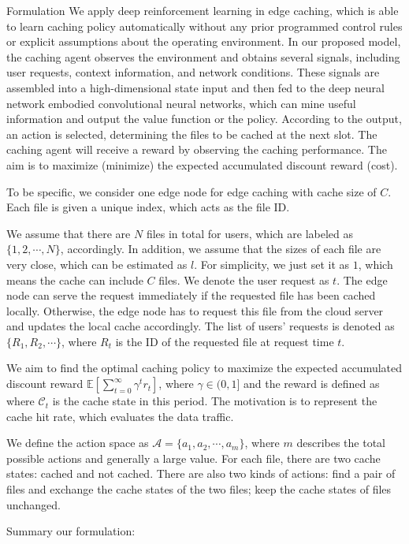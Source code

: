 \documentclass{article}
\begin{document}
\begin{section}{Formulation}
    We apply deep reinforcement learning in edge caching, which is able to learn caching policy automatically without any prior programmed control rules or explicit assumptions about the operating environment. In our proposed model, the caching agent observes the environment and obtains several signals, including user requests, context information, and network conditions. These signals are assembled into a high-dimensional state input and then fed to the deep neural network embodied convolutional neural networks, which can mine useful information and output the value function or the policy. According to the output, an action is selected, determining the files to be cached at the next slot. The caching agent will receive a reward by observing the caching performance. The aim is to maximize (minimize) the expected accumulated discount reward (cost).

    To be specific, we consider one edge node for edge caching with cache size of $C$. Each file is given a unique index, which acts as the file ID. 

    We assume that there are $N$ files in total for users, which are labeled as $\{1,2,\cdots,N\}$, accordingly. In addition, we assume that the sizes of each file are very close, which can be estimated as $l$. For simplicity, we just set it as $1$, which means the cache can include $C$ files. We denote the user request as $t$. The edge node can serve the request immediately if the requested file has been cached locally. Otherwise, the edge node has to request this file from the cloud server and updates the local cache accordingly. The list of users' requests is denoted as $\{R_1,R_2,\cdots\}$, where $R_t$ is the ID of the requested file at request time $t$.

    We aim to find the optimal caching policy to maximize the expected accumulated discount reward $\mathbb{E}\left[\sum_{t=0}^{\infty}\gamma^tr_t\right]$, where $\gamma\in(0,1]$ and the reward is defined as
    where $\mathcal{C}_t$ is the cache state in this period. The motivation is to represent the cache hit rate, which evaluates the data traffic.
    
    We define the action space as $\mathcal{A}=\{a_1,a_2,\cdots,a_m\}$, where $m$ describes the total possible actions and generally a large value. For each file, there are two cache states: cached and not cached. There are also two kinds of actions: find a pair of files and exchange the cache states of the two files; keep the cache states of files unchanged.
 
    Summary our formulation:\\
    
\end{section}
\end{document}

